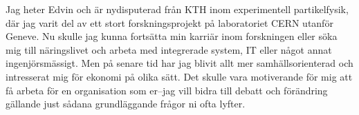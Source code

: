 \documentclass[11pt, a4paper]{../awesome-cv} %
\begin{document}
\makecvheader %

\makelettertitle %


\begin{cvletter}
\vspace{.6cm}

Jag heter Edvin och är nydisputerad från KTH inom experimentell partikelfysik, där jag varit del av ett stort forskningsprojekt på laboratoriet CERN utanför Geneve.
Nu skulle jag kunna fortsätta min karriär inom forskningen eller söka mig till näringslivet och arbeta med integrerade system, IT eller något annat ingenjörsmässigt.
Men på senare tid har jag blivit allt mer samhällsorienterad och intresserat mig för ekonomi på olika sätt. %
Det skulle vara motiverande för mig att få arbeta för en organisation som er–jag vill bidra till debatt och förändring gällande just sådana grundläggande frågor ni ofta lyfter.


\end{cvletter}
\end{document}
